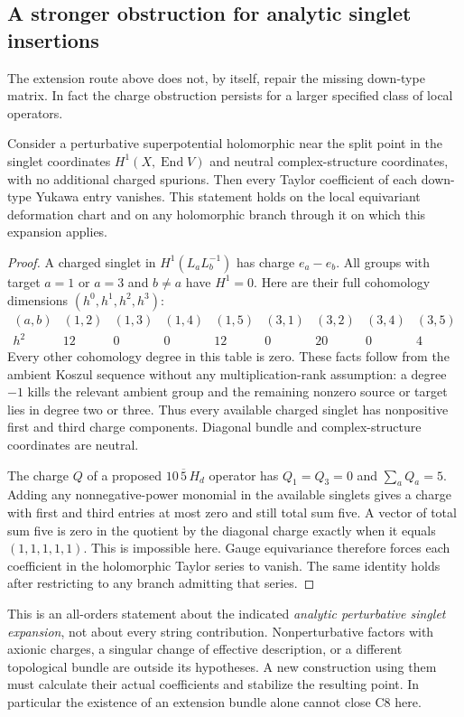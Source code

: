 \subsection{A stronger obstruction for analytic singlet insertions}
The extension route above does not, by itself, repair the missing
down-type matrix. In fact the charge obstruction persists for a larger
specified class of local operators.
\begin{proposition}\label{prop:singletobstruction}
Consider a perturbative superpotential holomorphic near the split point
in the singlet coordinates $H^1(X,\operatorname{End}V)$ and neutral
complex-structure coordinates, with no additional charged spurions.
Then every Taylor coefficient of each down-type Yukawa entry vanishes.
This statement holds on the local equivariant deformation chart and on
any holomorphic branch through it on which this expansion applies.
\end{proposition}
\begin{proof}
A charged singlet in $H^1(L_aL_b^{-1})$ has charge $e_a-e_b$.
All groups with target $a=1$ or $a=3$ and $b\ne a$ have $H^1=0$.
Here are their full cohomology dimensions $(h^0,h^1,h^2,h^3)$:
\[
\begin{array}{c|cccccccc}
(a,b)&(1,2)&(1,3)&(1,4)&(1,5)&(3,1)&(3,2)&(3,4)&(3,5)\\\hline
h^2&12&0&0&12&0&20&0&4
\end{array}
\]
Every other cohomology degree in this table is zero. These facts follow
from the ambient Koszul sequence without any multiplication-rank
assumption: a degree $-1$ kills the relevant ambient group and the
remaining nonzero source or target lies in degree two or three.
Thus every available charged singlet has nonpositive first and third
charge components. Diagonal bundle and complex-structure coordinates
are neutral.

The charge $Q$ of a proposed $10\,\overline5\,H_d$ operator has
$Q_1=Q_3=0$ and $\sum_a Q_a=5$. Adding any nonnegative-power monomial
in the available singlets gives a charge with first and third entries
at most zero and still total sum five. A vector of total sum five is
zero in the quotient by the diagonal charge exactly when it equals
$(1,1,1,1,1)$. This is impossible here. Gauge equivariance therefore
forces each coefficient in the holomorphic Taylor series to vanish.
The same identity holds after restricting to any branch admitting
that series.
\end{proof}
This is an all-orders statement about the indicated \emph{analytic
perturbative singlet expansion}, not about every string contribution.
Nonperturbative factors with axionic charges, a singular change of
effective description, or a different topological bundle are outside
its hypotheses. A new construction using them must calculate their
actual coefficients and stabilize the resulting point. In particular
the existence of an extension bundle alone cannot close C8 here.

